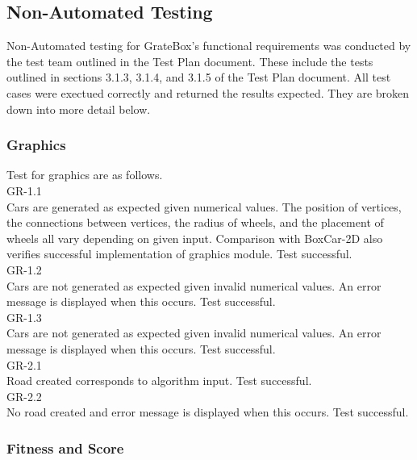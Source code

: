 \documentclass[12pt, titlepage]{article}
\begin{document}
\subsection{Non-Automated Testing}

Non-Automated testing for GrateBox's functional requirements was conducted by the test team outlined in the Test Plan document. These include the tests outlined in sections 3.1.3, 3.1.4, and 3.1.5 of the Test Plan document. All test cases were exectued correctly and returned the results expected. They are broken down into more detail below.

\subsubsection{Graphics}

Test for graphics are as follows.\\

GR-1.1\\

Cars are generated as expected given numerical values. The position of vertices, the connections between vertices, the radius of wheels, and the placement of wheels all vary depending on given input. Comparison with BoxCar-2D also verifies successful implementation of graphics module. Test successful.\\

GR-1.2\\

Cars are not generated as expected given invalid numerical values. An error message is displayed when this occurs. Test successful.\\

GR-1.3\\

Cars are not generated as expected given invalid numerical values. An error message is displayed when this occurs. Test successful.\\

GR-2.1\\

Road created corresponds to algorithm input. Test successful.\\

GR-2.2\\

No road created and error message is displayed when this occurs. Test successful.

\subsubsection{Fitness and Score}
\end{document}
